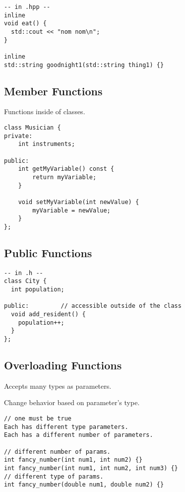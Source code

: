 \begin{verbatim}
-- in .hpp -- 
inline 
void eat() {
  std::cout << "nom nom\n";
}

inline
std::string goodnight1(std::string thing1) {}
\end{verbatim}

\subsection{Member Functions}

Functions inside of classes.

\begin{verbatim}
class Musician {
private:
    int instruments;

public:
    int getMyVariable() const {
        return myVariable;
    }

    void setMyVariable(int newValue) {
        myVariable = newValue;
    }
};
\end{verbatim}

\subsection{Public Functions}

\begin{verbatim}
-- in .h --
class City {
  int population; 
 
public:         // accessible outside of the class
  void add_resident() { 
    population++;
  }
};
\end{verbatim}

\subsection{Overloading Functions}

Accepts many types as parameters.

Change behavior based on parameter's type.

\begin{verbatim}
// one must be true
Each has different type parameters.
Each has a different number of parameters.
    
// different number of params.
int fancy_number(int num1, int num2) {}
int fancy_number(int num1, int num2, int num3) {}
// different type of params.
int fancy_number(double num1, double num2) {}
\end{verbatim}

